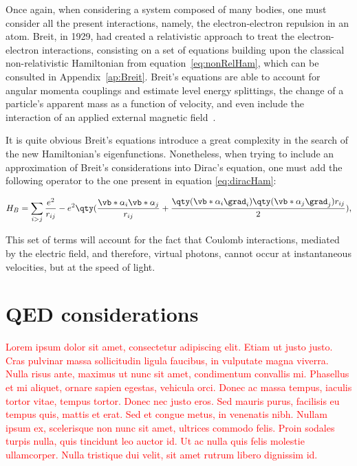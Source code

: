 Once again, when considering a system composed of many bodies, one must consider all the present interactions, namely, the electron-electron repulsion in an atom.
 Breit, in 1929, had created a relativistic approach to treat the electron-electron interactions, consisting on a set of equations building upon the classical non-relativistic Hamiltonian from equation~\eqref{eq:nonRelHam}, which can be consulted in Appendix~\ref{ap:Breit}.
  Breit's equations are able to account for angular momenta couplings and estimate level energy splittings, the change of a particle's apparent mass as a function of velocity, and even include the interaction of an applied external magnetic field~\cite{Bethe1977}.

  It is quite obvious Breit's equations introduce a great complexity in the search of the new Hamiltonian's eigenfunctions. Nonetheless, when trying to include an approximation of Breit's considerations into Dirac's equation, one must add the following operator to the one present in equation \eqref{eq:diracHam}:

  \begin{equation}
    H_B = \sum_{i>j}\frac{e^2}{r_{ij}} - e^2\qty(\frac{\vb*{\alpha}_i\vb*{\alpha}_j}{r_{ij}}+\frac{\qty(\vb*{\alpha}_i \grad_i)\qty(\vb*{\alpha}_j \grad_j)r_{ij}}{2})  ,
    \label{eq:BreitHam}
  \end{equation}

This set of terms will account for the fact that Coulomb interactions, mediated by the electric field, and therefore, \gls{virtual photons}, cannot occur at instantaneous velocities, but at the speed of light.


\section{\gls{QED} considerations}


\textcolor{red}{Lorem ipsum dolor sit amet, consectetur adipiscing elit. Etiam ut justo justo. Cras pulvinar massa sollicitudin ligula faucibus, in vulputate magna viverra. Nulla risus ante, maximus ut nunc sit amet, condimentum convallis mi. Phasellus et mi aliquet, ornare sapien egestas, vehicula orci. Donec ac massa tempus, iaculis tortor vitae, tempus tortor. Donec nec justo eros. Sed mauris purus, facilisis eu tempus quis, mattis et erat. Sed et congue metus, in venenatis nibh. Nullam ipsum ex, scelerisque non nunc sit amet, ultrices commodo felis. Proin sodales turpis nulla, quis tincidunt leo auctor id. Ut ac nulla quis felis molestie ullamcorper. Nulla tristique dui velit, sit amet rutrum libero dignissim id.}

